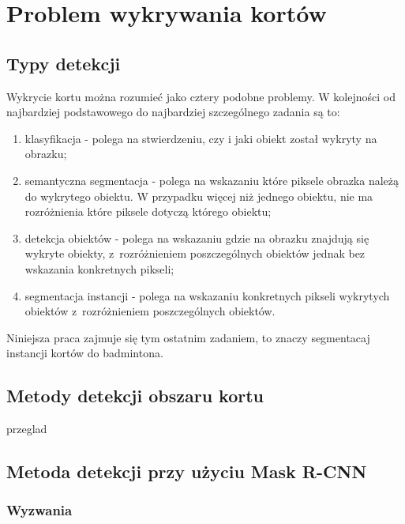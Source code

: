 \chapter{Problem wykrywania kortów}

\section{Typy detekcji}
\label{sec:typy_detekcji}

Wykrycie kortu można rozumieć jako cztery podobne problemy. W kolejności od najbardziej podstawowego do najbardziej szczególnego zadania są to:

\begin{enumerate}
	\item klasyfikacja - polega na stwierdzeniu, czy i jaki obiekt został wykryty na obrazku;
  \item semantyczna segmentacja - polega na wskazaniu które piksele obrazka należą do wykrytego obiektu.
        W przypadku więcej niż jednego obiektu, nie ma rozróżnienia które piksele dotyczą którego obiektu;
	\item detekcja obiektów - polega na wskazaniu gdzie na obrazku znajdują się wykryte obiekty, z~rozróżnieniem poszczególnych obiektów jednak bez wskazania konkretnych pikseli;
	\item segmentacja instancji - polega na wskazaniu konkretnych pikseli wykrytych obiektów z~rozróżnieniem poszczególnych obiektów.
\end{enumerate}

Niniejsza praca zajmuje się tym ostatnim zadaniem, to znaczy segmentacaj instancji kortów do badmintona.

\section{Metody detekcji obszaru kortu}


{przeglad}

\section{Metoda detekcji przy użyciu Mask R-CNN}

\subsection{Wyzwania}

